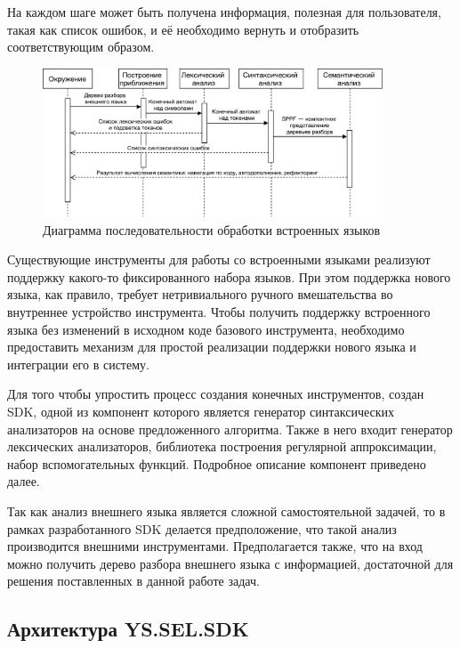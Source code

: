 На каждом шаге может быть получена информация, полезная для пользователя, такая как список ошибок, и её необходимо вернуть и отобразить соответствующим образом.

\begin{figure}[h!]
\begin{center}
\includegraphics[width=0.9\textwidth]{pics/Seq_sel_processing_rus}
\caption{Диаграмма последовательности обработки встроенных языков}
\label{fig:SeqSelProcessing} 
\end{center}
\end{figure}


Существующие инструменты для работы со встроенными языками реализуют поддержку какого-то фиксированного набора языков. При этом поддержка нового языка, как правило, требует нетривиального ручного вмешательства во внутреннее устройство инструмента. Чтобы получить поддержку встроенного языка без изменений в исходном коде базового инструмента, необходимо предоставить механизм для простой реализации поддержки нового языка и интеграции его в систему. 

Для того чтобы упростить процесс создания конечных инструментов, создан SDK, одной из компонент которого является генератор синтаксических анализаторов на основе предложенного алгоритма. Также в него входит генератор лексических анализаторов, библиотека построения регулярной аппроксимации, набор вспомогательных функций. Подробное описание компонент приведено далее.

Так как анализ внешнего языка является сложной самостоятельной задачей, то в рамках разработанного SDK делается предположение, что такой анализ производится внешними инструментами. Предполагается также, что на вход можно получить дерево разбора внешнего языка с информацией, достаточной для решения поставленных в данной работе задач. 


\subsection{Архитектура YS.SEL.SDK}

